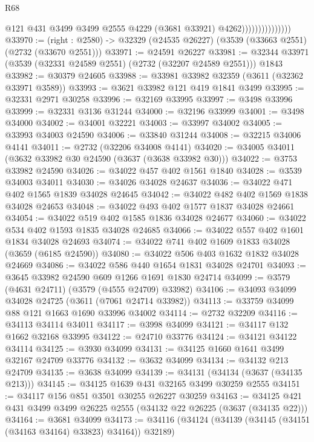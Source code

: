 \begin{lexlean}{R68}
\begin{coremodule}
                                  @121
                                  @431
                                  @3499
                                  @3499
                                  @2555
                                  @4229
                                  (@3681 @33921)
                                  @4262)))))))))))))))
@33970 := (right : @2580) -> @32329 (@24535 @26227) (@3539 (@33663 @2551) (@2732 (@33670 @2551)))
@33971 := @24591 @26227
@33981 := @32344 @33971 (@3539 (@32331 @24589 @2551) (@2732 (@32207 @24589 @2551))) @1843
@33982 := @30379 @24605
@33988 := @33981 @33982 @32359 (@3611 (@32362 @33971 @3589))
@33993 := @3621 @33982 @121 @419 @1841 @3499
@33995 := @32331 @2971 @30258
@33996 := @32169 @33995
@33997 := @3498 @33996
@33999 := @32331 @3136 @31244
@34000 := @32196 @33999
@34001 := @3498 @34000
@34002 := @34001 @32221
@34003 := @33997 @34002
@34005 := @33993 @34003 @24590
@34006 := @33840 @31244
@34008 := @32215 @34006 @4141
@34011 := @2732 (@32206 @34008 @4141)
@34020 := @34005 @34011 (@3632 @33982 @30 @24590 (@3637 (@3638 @33982 @30)))
@34022 := @3753 @33982 @24590
@34026 := @34022 @457 @402 @1561 @1840
@34028 := @3539 @34003 @34011
@34030 := @34026 @34028 @24637
@34036 := @34022 @471 @402 @1565 @1839 @34028 @24645
@34042 := @34022 @482 @402 @1569 @1838 @34028 @24653
@34048 := @34022 @493 @402 @1577 @1837 @34028 @24661
@34054 := @34022 @519 @402 @1585 @1836 @34028 @24677
@34060 := @34022 @534 @402 @1593 @1835 @34028 @24685
@34066 := @34022 @557 @402 @1601 @1834 @34028 @24693
@34074 := @34022 @741 @402 @1609 @1833 @34028 (@3659 (@6185 @24590))
@34080 := @34022 @506 @403 @1632 @1832 @34028 @24669
@34086 := @34022 @586 @440 @1654 @1831 @34028 @24701
@34093 := @3645 @33982 @24590 @609 @1266 @1691 @1830 @24714
@34099 := @3579 (@4631 @24711) (@3579 (@4555 @24709) @33982)
@34106 := @34093 @34099 @34028 @24725 (@3611 (@7061 @24714 @33982))
@34113 := @33759 @34099 @88 @121 @1663 @1690 @33996 @34002
@34114 := @2732 @32209
@34116 := @34113 @34114 @34011
@34117 := @3998 @34099
@34121 := @34117 @132 @1662 @32168 @33995
@34122 := @24710 @33776
@34124 := @34121 @34122 @34114
@34125 := @3930 @34099
@34131 := @34125 @1660 @1641 @3499 @32167 @24709 @33776
@34132 := @3632 @34099
@34134 := @34132 @213 @24709
@34135 := @3638 @34099
@34139 := @34131 (@34134 (@3637 (@34135 @213)))
@34145 := @34125 @1639 @431 @32165 @3499 @30259 @2555
@34151 := @34117 @156 @851 @3501 @30255 @26227 @30259
@34163 := @34125 @421 @431 @3499 @3499 @26225 @2555 (@34132 @22 @26225 (@3637 (@34135 @22)))
@34164 := @3681 @34099
@34173 := @34116 (@34124 (@34139 (@34145 (@34151 (@34163 @34164) @33823) @34164)) @32189)

\end{coremodule}
\end{lexlean}
